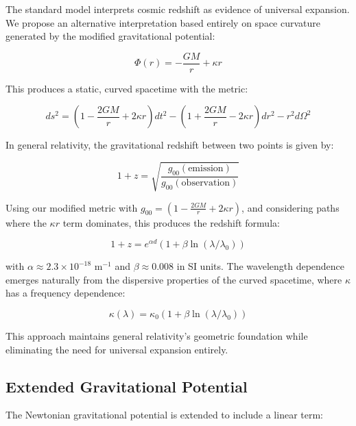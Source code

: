 \documentclass[12pt,a4paper]{article}
\begin{document}
	The standard model interprets cosmic redshift as evidence of universal expansion. We propose an alternative interpretation based entirely on space curvature generated by the modified gravitational potential:
	
	\begin{equation}
		\Phi(r) = -\frac{GM}{r} + \kappa r
	\end{equation}
	
	This produces a static, curved spacetime with the metric:
	
	\begin{equation}
		ds^2 = (1 - \frac{2GM}{r} + 2\kappa r)dt^2 - (1 + \frac{2GM}{r} - 2\kappa r)dr^2 - r^2d\Omega^2
	\end{equation}
	
	In general relativity, the gravitational redshift between two points is given by:
	
	\begin{equation}
		1 + z = \sqrt{\frac{g_{00}(\text{emission})}{g_{00}(\text{observation})}}
	\end{equation}
	
	Using our modified metric with $g_{00} = (1 - \frac{2GM}{r} + 2\kappa r)$, and considering paths where the $\kappa r$ term dominates, this produces the redshift formula:
	
	\begin{equation}
		1 + z = e^{\alpha d}(1 + \beta \ln(\lambda/\lambda_0))
	\end{equation}
	
	with $\alpha \approx 2.3\times10^{-18}$ m$^{-1}$ and $\beta \approx 0.008$ in SI units. The wavelength dependence emerges naturally from the dispersive properties of the curved spacetime, where $\kappa$ has a frequency dependence:
	
	\begin{equation}
		\kappa(\lambda) = \kappa_0(1 + \beta \ln(\lambda/\lambda_0))
	\end{equation}
	
	This approach maintains general relativity's geometric foundation while eliminating the need for universal expansion entirely.
	
	\subsection{Extended Gravitational Potential}
	
	The Newtonian gravitational potential is extended to include a linear term:
	
\end{document}
